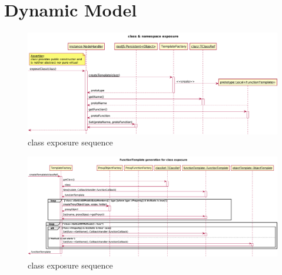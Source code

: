 \section{Dynamic Model}

\begin{figure}[htb]
	\centering
	\includegraphics[width=18cm]{./latex/resources/classExposureSequence.pdf}
	\caption{class exposure sequence}
\end{figure}

\begin{figure}[htb]
	\centering
	\includegraphics[width=18cm]{./latex/resources/functionTemplateGenerate.pdf}
	\caption{class exposure sequence}
\end{figure}

\pagebreak
